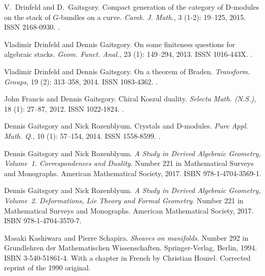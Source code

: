 \documentclass{oupau}
\theoremstyle{remark}
\begin{document}
\begin{thebibliography}{20}
V.~Drinfeld and D.~Gaitsgory.
\newblock Compact generation of the category of {D}-modules on the stack of
  {$G$}-bundles on a curve.
\newblock \emph{Camb. J. Math.}, 3 (1-2):
  19--125, 2015.
\newblock ISSN 2168-0930.
\newblock {}.

Vladimir Drinfeld and Dennis Gaitsgory.
\newblock On some finiteness questions for algebraic stacks.
\newblock \emph{Geom. Funct. Anal.}, 23 (1):
  149--294, 2013.
\newblock ISSN 1016-443X.
\newblock {}.

Vladimir Drinfeld and Dennis Gaitsgory.
\newblock On a theorem of {B}raden.
\newblock \emph{Transform. Groups}, 19 (2): 313--358,
  2014.
\newblock ISSN 1083-4362.
\newblock {}.

John Francis and Dennis Gaitsgory.
\newblock Chiral {K}oszul duality.
\newblock \emph{Selecta Math. (N.S.)}, 18 (1):
  27--87, 2012.
\newblock ISSN 1022-1824.
\newblock {}.

Dennis Gaitsgory and Nick Rozenblyum.
\newblock Crystals and {D}-modules.
\newblock \emph{Pure Appl. Math. Q.}, 10
  (1): 57--154, 2014.
\newblock ISSN 1558-8599.
\newblock {}.

Dennis Gaitsgory and Nick Rozenblyum.
\newblock \emph{A Study in Derived Algebraic Geometry, Volume~1. Correspondences and Duality}.
\newblock Number 221 in Mathematical Surveys and Monographs.
  American Mathematical Society, 2017{}.
\newblock ISBN 978-1-4704-3569-1.

Dennis Gaitsgory and Nick Rozenblyum.
\newblock \emph{A Study in Derived Algebraic Geometry, Volume~2. Deformations, Lie Theory and Formal Geometry}.
\newblock Number 221 in Mathematical Surveys and Monographs.
  American Mathematical Society, 2017{}.
\newblock ISBN 978-1-4704-3570-7.

Masaki Kashiwara and Pierre Schapira.
\newblock \emph{Sheaves on manifolds}.
\newblock Number 292 in Grundlehren der Mathematischen Wissenschaften.
  Springer-Verlag, Berlin, 1994.
\newblock ISBN 3-540-51861-4.
\newblock With a chapter in French by Christian Houzel.
\newblock Corrected reprint of the 1990 original.


\end{thebibliography}
\end{document}

